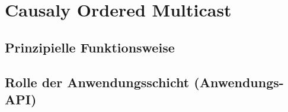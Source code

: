 \section{Causaly Ordered Multicast}
\subsection{Prinzipielle Funktionsweise}
\subsection{Rolle der Anwendungsschicht (Anwendungs-API)}
